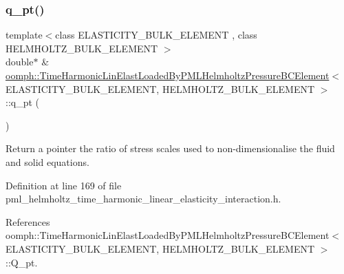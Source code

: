 \mbox{\label{classoomph_1_1TimeHarmonicLinElastLoadedByPMLHelmholtzPressureBCElement_acec17c9c893e15d4d680d92f81a7f758}} 
\subsubsection{\texorpdfstring{q\+\_\+pt()}{q\_pt()}}
{\footnotesize\ttfamily template$<$class E\+L\+A\+S\+T\+I\+C\+I\+T\+Y\+\_\+\+B\+U\+L\+K\+\_\+\+E\+L\+E\+M\+E\+NT , class H\+E\+L\+M\+H\+O\+L\+T\+Z\+\_\+\+B\+U\+L\+K\+\_\+\+E\+L\+E\+M\+E\+NT $>$ \\
double$\ast$ \& \hyperlink{classoomph_1_1TimeHarmonicLinElastLoadedByPMLHelmholtzPressureBCElement}{oomph\+::\+Time\+Harmonic\+Lin\+Elast\+Loaded\+By\+P\+M\+L\+Helmholtz\+Pressure\+B\+C\+Element}$<$ E\+L\+A\+S\+T\+I\+C\+I\+T\+Y\+\_\+\+B\+U\+L\+K\+\_\+\+E\+L\+E\+M\+E\+NT, H\+E\+L\+M\+H\+O\+L\+T\+Z\+\_\+\+B\+U\+L\+K\+\_\+\+E\+L\+E\+M\+E\+NT $>$\+::q\+\_\+pt (\begin{DoxyParamCaption}{ }\end{DoxyParamCaption})\hspace{0.3cm}{\ttfamily [inline]}}



Return a pointer the ratio of stress scales used to non-\/dimensionalise the fluid and solid equations. 



Definition at line 169 of file pml\+\_\+helmholtz\+\_\+time\+\_\+harmonic\+\_\+linear\+\_\+elasticity\+\_\+interaction.\+h.



References oomph\+::\+Time\+Harmonic\+Lin\+Elast\+Loaded\+By\+P\+M\+L\+Helmholtz\+Pressure\+B\+C\+Element$<$ E\+L\+A\+S\+T\+I\+C\+I\+T\+Y\+\_\+\+B\+U\+L\+K\+\_\+\+E\+L\+E\+M\+E\+N\+T, H\+E\+L\+M\+H\+O\+L\+T\+Z\+\_\+\+B\+U\+L\+K\+\_\+\+E\+L\+E\+M\+E\+N\+T $>$\+::\+Q\+\_\+pt.



